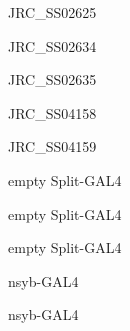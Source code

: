 \documentclass[17pt]{extarticle}
\begin{document}
\newpage\vspace*{-0.15cm}
\begin{large}
JRC\_SS02625 \\[0.5em]
\end{large}

\newpage\vspace*{-0.15cm}
\begin{large}
JRC\_SS02634 \\[0.5em]
\end{large}

\newpage\vspace*{-0.15cm}
\begin{large}
JRC\_SS02635 \\[0.5em]
\end{large}

\newpage\vspace*{-0.15cm}
\begin{large}
JRC\_SS04158 \\[0.5em]
\end{large}

\newpage\vspace*{-0.15cm}
\begin{large}
JRC\_SS04159 \\[0.5em]
\end{large}

\newpage\vspace*{-0.15cm}
\begin{large}
empty Split-GAL4 \\[0.5em]
\end{large}

\newpage\vspace*{-0.15cm}
\begin{large}
empty Split-GAL4 \\[0.5em]
\end{large}

\newpage\vspace*{-0.15cm}
\begin{large}
empty Split-GAL4 \\[0.5em]
\end{large}

\newpage\vspace*{-0.15cm}
\begin{large}
nsyb-GAL4 \\[0.5em]
\end{large}

\newpage\vspace*{-0.15cm}
\begin{large}
nsyb-GAL4 \\[0.5em]
\end{large}
\end{document}
